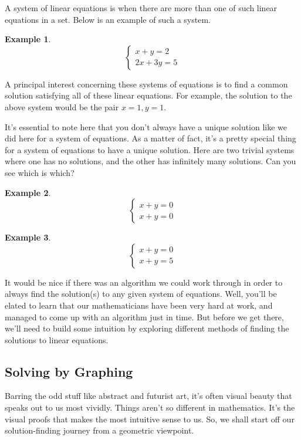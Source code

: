 \documentclass{scrbook}
\theoremstyle{definition}
\newtheorem{example}{Example}
\begin{document}
A system of linear equations is when there are more than one of such linear equations in a set. Below is an example of such a system.

\begin{example}
  \[
    \begin{cases}
      x + y = 2\\
      2x + 3y = 5
    \end{cases}
  \]
\end{example}

A principal interest concerning these systems of equations is to find a common solution satisfying all of these linear equations. For example, the solution to the above system would be the pair $x = 1, y = 1$. 

It's essential to note here that you don't always have a unique solution like we did here for a system of equations. As a matter of fact, it's a pretty special thing for a system of equations to have a unique solution. Here are two trivial systems where one has no solutions, and the other has infinitely many solutions. Can you see which is which?

\begin{example}
  \[
    \begin{cases}
      x + y = 0\\
      x + y = 0
    \end{cases}
  \]
\end{example}

\begin{example}
  \[
    \begin{cases}
      x + y = 0\\
      x + y = 5
    \end{cases}
  \]
\end{example}

It would be nice if there was an algorithm we could work through in order to always find the solution(s) to any given system of equations. Well, you'll be elated to learn that our mathematicians have been very hard at work, and managed to come up with an algorithm just in time. But before we get there, we'll need to build some intuition by exploring different methods of finding the solutions to linear equations. 

\subsection{Solving by Graphing}

Barring the odd stuff like abstract and futurist art, it's often visual beauty that speaks out to us most vividly. Things aren't so different in mathematics. It's the visual proofs that makes the most intuitive sense to us. So, we shall start off our solution-finding journey from a geometric viewpoint.
\end{document}
